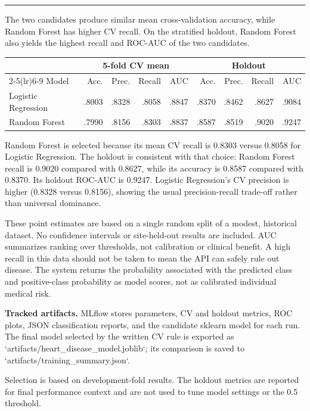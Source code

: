 \documentclass[10pt]{article}
\newcommand{\sectiontitle}[1]{\vspace*{0.15in}{\Large\bfseries\color{navy}#1}\par\vspace{0.08in}\hrule\vspace{0.16in}}
\newcommand{\callout}[1]{\noindent\colorbox{light}{\parbox{\dimexpr\linewidth-2\fboxsep}{#1}}}
\begin{document}
\newpage
\sectiontitle{4. Model comparison and selection}
The two candidates produce similar mean cross-validation accuracy, while Random Forest has higher CV recall. On the stratified holdout, Random Forest also yields the highest recall and ROC-AUC of the two candidates.

\begin{center}
\small
\begin{tabular}{lrrrrrrrr}
\toprule
& \multicolumn{4}{c}{5-fold CV mean} & \multicolumn{4}{c}{Holdout} \\
\cmidrule(lr){2-5}\cmidrule(lr){6-9}
Model & Acc. & Prec. & Recall & AUC & Acc. & Prec. & Recall & AUC \\
\midrule
Logistic Regression & .8003 & .8328 & .8058 & .8847 & .8370 & .8462 & .8627 & .9084 \\
Random Forest & .7990 & .8156 & .8303 & .8837 & .8587 & .8519 & .9020 & .9247 \\
\bottomrule
\end{tabular}
\end{center}

Random Forest is selected because its mean CV recall is 0.8303 versus 0.8058 for Logistic Regression. The holdout is consistent with that choice: Random Forest recall is 0.9020 compared with 0.8627, while its accuracy is 0.8587 compared with 0.8370. Its holdout ROC-AUC is 0.9247. Logistic Regression's CV precision is higher (0.8328 versus 0.8156), showing the usual precision-recall trade-off rather than universal dominance.

These point estimates are based on a single random split of a modest, historical dataset. No confidence intervals or site-held-out results are included. AUC summarizes ranking over thresholds, not calibration or clinical benefit. A high recall in this data should not be taken to mean the API can safely rule out disease. The system returns the probability associated with the predicted class and positive-class probability as model scores, not as calibrated individual medical risk.

\vspace{0.12in}
\textbf{Tracked artifacts.} MLflow stores parameters, CV and holdout metrics, ROC plots, JSON classification reports, and the candidate sklearn model for each run. The final model selected by the written CV rule is exported as `artifacts/heart_disease_model.joblib`; its comparison is saved to `artifacts/training_summary.json`.

\callout{Selection is based on development-fold results. The holdout metrics are reported for final performance context and are not used to tune model settings or the 0.5 threshold.}
\end{document}

